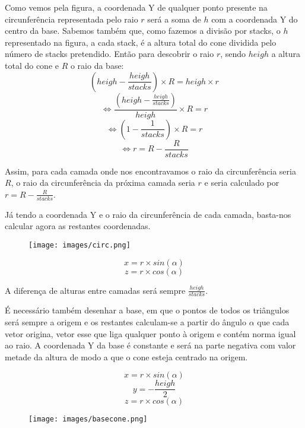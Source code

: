 \Huge\documentclass{article}
\begin{document}
\vspace{0.5cm}

Como vemos pela figura, a coordenada Y de qualquer ponto presente na circunferência representada pelo raio $r$ será a soma de $h$ com a coordenada Y do centro da base.
Sabemos também que, como fazemos a divisão por stacks, o $h$ representado na figura, a cada stack, é a altura total do cone dividida pelo número de stacks pretendido.
Então para descobrir o raio $r$, sendo $heigh$ a altura total do cone e $R$ o raio da base:
\[(heigh-\frac{heigh}{stacks}) \times R = heigh \times r\]
\[\Leftrightarrow \frac{(heigh-\frac{heigh}{stacks})}{heigh} \times R = r\]
\[\Leftrightarrow (1-\frac{1}{stacks}) \times R = r\]
\[\Leftrightarrow r = R - \frac{R}{stacks}\]

\vspace{1cm}

Assim, para cada camada onde nos encontravamos o raio da circunferência seria $R$, o raio da circunferência da próxima camada seria $r$ e seria calculado por $r = R - \frac{R}{stacks}$. 

\vspace{0.5cm}

Já tendo a coordenada Y e o raio da circunferência de cada camada, basta-nos calcular agora as restantes coordenadas.

\begin{figure}[H]
\centering
\texttt{[image: images/circ.png]}
\end{figure}

\[x = r \times sin (\alpha)\]
\[z= r \times cos (\alpha)\]

A diferença de alturas entre camadas será sempre $\frac{heigh}{stacks}$.

\vspace {0.5cm}

É necessário também desenhar a base, em que o pontos de todos os triângulos será sempre a origem e os restantes calculam-se a partir do ângulo $\alpha$ que cada vetor origina, vetor esse que liga qualquer ponto à origem e contém norma igual ao raio. A coordenada Y da base é constante e será na parte negativa com valor metade da altura de modo a que o cone esteja centrado na origem.

\[x = r \times sin(\alpha)\]
\[y = - \frac{heigh}{2}\]
\[z = r \times cos (\alpha)\]

\begin{figure}[H]
\centering
\texttt{[image: images/basecone.png]}
\end{figure}
\end{document}
